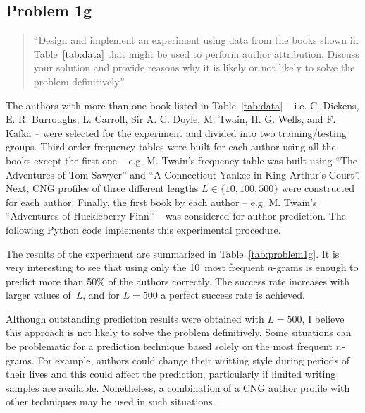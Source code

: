 \documentclass[conference]{IEEEtran}
\newcommand{\codefile}[1]{
  \begin{framed}
  \fontsize{5.65}{6.78}\selectfont
  
  \end{framed}
}
\begin{document}
\subsection{Problem 1g}

\begin{quote}
``Design and implement an experiment using data from the books shown in Table~\ref{tab:data} that might be used to perform author attribution. 
Discuss your solution and provide reasons why it is likely or not likely to solve the problem definitively.''
\end{quote}
\vspace{0.75em}

The authors with more than one book listed in Table~\ref{tab:data} 
-- i.e. C. Dickens, E. R. Burroughs, L. Carroll, Sir A. C. Doyle, M. Twain, H. G. Wells, and F. Kafka -- 
were selected for the experiment and divided into two training/testing groups.
Third-order frequency tables were built for each author using all the books except the first one 
-- e.g. M. Twain's frequency table was built using ``The Adventures of Tom Sawyer'' and ``A Connecticut Yankee in King Arthur's Court''.
Next, CNG profiles of three different lengths $L\in\{10,100,500\}$ were constructed for each author.
Finally, the first book by each author 
-- e.g. M. Twain's ``Adventures of Huckleberry Finn'' -- 
was considered for author prediction. 
The following Python code implements this experimental procedure.

\codefile{problem1g.py}

The results of the experiment are summarized in Table~\ref{tab:problem1g}.
It is very interesting to see that using only the 10~most frequent \mbox{$n$-grams} is enough to predict more than 50\% of the authors correctly.
The success rate increases with larger values of~$L$, and for $L=500$ a perfect success rate is achieved.

Although outstanding prediction results were obtained with $L=500$, I believe this approach is not likely to solve the problem definitively.
Some situations can be problematic for a prediction technique based solely on the most frequent \mbox{$n$-grams}.
For example, authors could change their writting style during periods of their lives and this could affect the prediction, particularly if limited writing samples are available.
Nonetheless, a combination of a CNG author profile with other techniques may be used in such situations.
\end{document}
